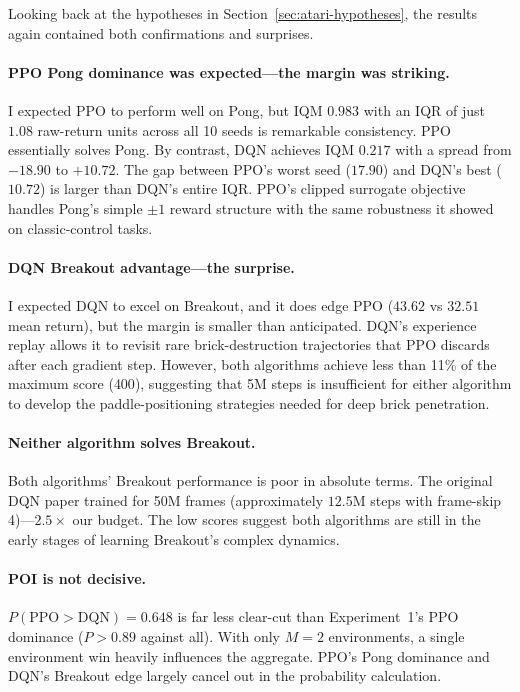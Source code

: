 Looking back at the hypotheses in Section~\ref{sec:atari-hypotheses},
the results again contained both confirmations and surprises.

\paragraph{PPO Pong dominance was expected---the margin was striking.}
I expected PPO to perform well on Pong, but IQM $0.983$ with an IQR
of just $1.08$ raw-return units across all 10 seeds is remarkable
consistency. PPO essentially solves Pong. By contrast, DQN achieves
IQM $0.217$ with a spread from $-18.90$ to $+10.72$. The gap between
PPO's worst seed ($17.90$) and DQN's best ($10.72$) is larger than
DQN's entire IQR. PPO's clipped surrogate objective handles Pong's
simple $\pm1$ reward structure with the same robustness it showed on
classic-control tasks.

\paragraph{DQN Breakout advantage---the surprise.}
I expected DQN to excel on Breakout, and it does edge PPO ($43.62$
vs $32.51$ mean return), but the margin is smaller than anticipated.
DQN's experience replay allows it to revisit rare brick-destruction
trajectories that PPO discards after each gradient step. However,
both algorithms achieve less than 11\% of the maximum score ($400$),
suggesting that 5M steps is insufficient for either algorithm to
develop the paddle-positioning strategies needed for deep brick
penetration.

\paragraph{Neither algorithm solves Breakout.}
Both algorithms' Breakout performance is poor in absolute terms.
The original DQN paper \citep{mnih2015human} trained for 50M frames
(approximately $12.5$M steps with frame-skip 4)---$2.5\times$ our
budget. The low scores suggest both algorithms are still in the
early stages of learning Breakout's complex dynamics.

\paragraph{POI is not decisive.}
$P(\text{PPO} > \text{DQN}) = 0.648$ is far less clear-cut than
Experiment~1's PPO dominance ($P > 0.89$ against all). With only
$M = 2$ environments, a single environment win heavily influences
the aggregate. PPO's Pong dominance and DQN's Breakout edge largely
cancel out in the probability calculation.

